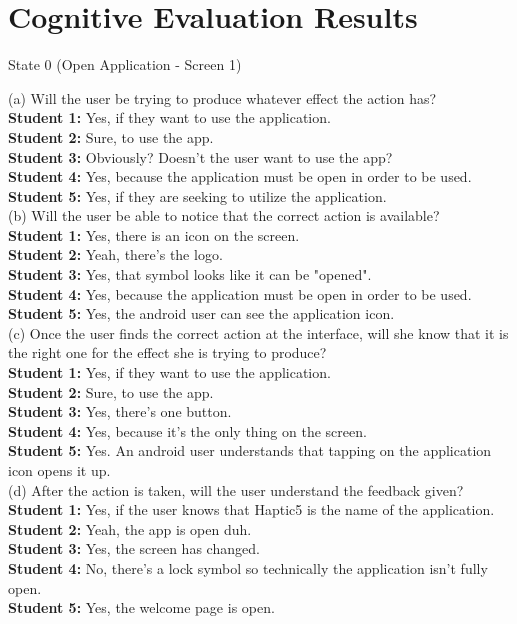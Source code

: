\documentclass[pdftex,12pt,a4paper]{report}
\begin{document}
\section*{Cognitive Evaluation Results}

\begin{center}
State 0 (Open Application - Screen 1)
\end{center}

\noindent(a) Will the user be trying to produce whatever effect the action has?
\\\indent \textbf{Student 1:} Yes, if they want to use the application.
\\\indent \textbf{Student 2:} Sure, to use the app.
\\\indent \textbf{Student 3:} Obviously? Doesn't the user want to use the app?
\\\indent \textbf{Student 4:} Yes, because the application must be open in order to be used.
\\\indent \textbf{Student 5:} Yes, if they are seeking to utilize the application.
\\(b) Will the user be able to notice that the correct action is available?
\\\indent \textbf{Student 1:} Yes, there is an icon on the screen.
\\\indent \textbf{Student 2:} Yeah, there's the logo.
\\\indent \textbf{Student 3:} Yes, that symbol looks like it can be "opened".
\\\indent \textbf{Student 4:} Yes, because the application must be open in order to be used.
\\\indent \textbf{Student 5:} Yes, the android user can see the application icon.
\\(c) Once the user finds the correct action at the interface, will she know that it is the right one for the effect she is trying to produce?
\\\indent \textbf{Student 1:} Yes, if they want to use the application.
\\\indent \textbf{Student 2:} Sure, to use the app.
\\\indent \textbf{Student 3:} Yes, there's one button.
\\\indent \textbf{Student 4:} Yes, because it's the only thing on the screen.
\\\indent \textbf{Student 5:} Yes. An android user understands that tapping on the application icon opens it up.
\\(d) After the action is taken, will the user understand the feedback given?
\\\indent \textbf{Student 1:} Yes, if the user knows that Haptic5 is the name of the application.
\\\indent \textbf{Student 2:} Yeah, the app is open duh.
\\\indent \textbf{Student 3:} Yes, the screen has changed.
\\\indent \textbf{Student 4:} No, there's a lock symbol so technically the application isn't fully open.
\\\indent \textbf{Student 5:} Yes, the welcome page is open.
\end{document}
